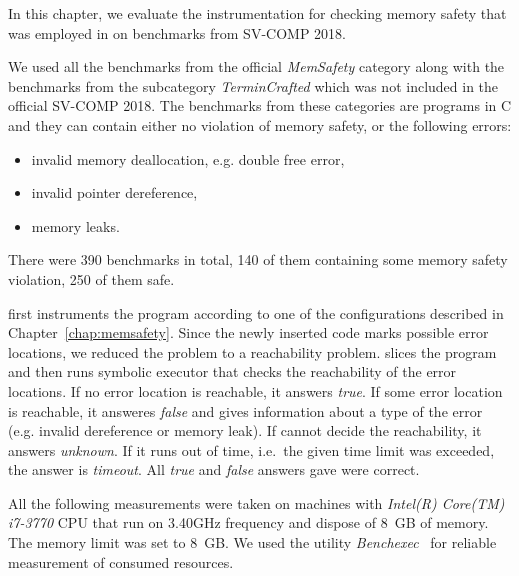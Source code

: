 In this chapter, we evaluate the instrumentation for checking memory safety
that was employed in \symbiotic on benchmarks from SV-COMP 2018.

We used all the benchmarks from the official \emph{MemSafety} category along
with the benchmarks from the subcategory \emph{TerminCrafted} which was not
included in the official SV-COMP 2018. The benchmarks from these categories are
programs in C and they can contain either no violation of memory safety, or the
following errors:
\begin{itemize}
  \item invalid memory deallocation, e.g. double free error,
  \item invalid pointer dereference,
  \item memory leaks.
\end{itemize}
There were 390 benchmarks in total, 140 of them containing some
memory safety violation, 250 of them safe.

\symbiotic first instruments the program according to one of the configurations
described in Chapter~\ref{chap:memsafety}. Since the newly inserted code marks
possible error locations, we reduced the problem to a reachability problem.
\symbiotic slices the program and then runs symbolic executor \klee that checks
the reachability of the error locations. If no error location is reachable, it
answers \emph{true}. If some error location is reachable, it answeres
\emph{false} and gives information about a type of the error (e.g.  invalid
dereference or memory leak). If \symbiotic cannot decide the reachability, it
answers \emph{unknown}. If it runs out of time, i.e.~the given time limit
was exceeded, the answer is \emph{timeout}. All \emph{true} and \emph{false}
answers \symbiotic gave were correct.

All the following measurements were taken on machines with \textit{Intel(R)
Core(TM) i7-3770} CPU that run on 3.40GHz frequency and dispose of 8~GB of
memory. The memory limit was set to 8~GB. We used the utility
\emph{Benchexec}~\cite{Beyer2015} for reliable measurement of consumed
resources.

